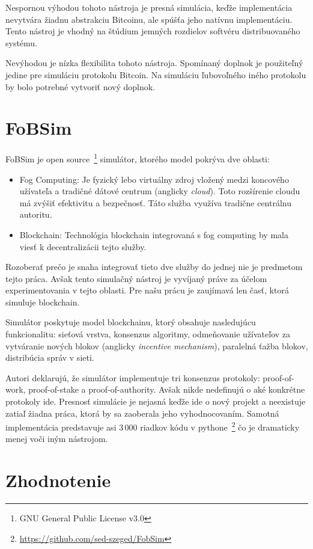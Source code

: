 Nespornou výhodou tohoto nástroja je presná simulácia, keďže implementácia nevytvára žiadnu abstrakciu Bitcoinu, ale spúšťa jeho natívnu implementáciu. Tento nástroj je vhodný na štúdium jemných rozdielov softvéru distribuovaného systému.

Nevýhodou je nízka flexibilita tohoto nástroja. Spomínaný doplnok je použiteľný jedine pre simuláciu protokolu Bitcoin. Na simuláciu ľubovoľného iného protokolu by bolo potrebné vytvoriť nový doplnok.~\cite{shadowBitcoin}

\section{FoBSim}

FoBSim je open source~\footnote{GNU General Public License v3.0} simulátor, ktorého model pokrýva dve oblasti:
\begin{itemize}
	\item Fog Computing: Je fyzický lebo virtuálny zdroj vložený medzi koncového užívateľa a tradičné dátové centrum (anglicky \textit{cloud}). Toto rozšírenie cloudu má zvýšiť efektivitu a bezpečnosť. Táto služba využíva tradične centrálnu autoritu.
	\item Blockchain: Technológia blockchain integrovaná s fog computing by mala viesť k decentralizácii tejto služby.
\end{itemize}
Rozoberať prečo je snaha integrovať tieto dve služby do jednej nie je predmetom tejto práca. Avšak tento simulačný nástroj je vyvíjaný práve za účelom experimentovania v tejto oblasti. Pre našu prácu je zaujímavá len časť, ktorá simuluje blockchain.

Simulátor poskytuje model blockchainu, ktorý obsahuje nasledujúcu funkcionalitu: sieťová vrstva, konsenzus algoritmy, odmeňovanie užívateľov za vytváranie nových blokov (anglicky \textit{incentive mechanism}), paralelná ťažba blokov, distribúcia správ v sieti.~\cite{fobsimWp}

Autori deklarujú, že simulátor implementuje tri konsenzus protokoly: proof-of-work, proof-of-stake a proof-of-authority. Avšak nikde nedefinujú o aké konkrétne protokoly ide. Presnosť simulácie je nejasná keďže ide o nový projekt a neexistuje zatiaľ žiadna práca, ktorá by sa zaoberala jeho vyhodnocovaním. Samotná implementácia predstavuje asi 3\,000 riadkov kódu v pythone~\footnote{\url{https://github.com/sed-szeged/FobSim}} čo je dramaticky menej voči iným nástrojom. 

\section{Zhodnotenie}

